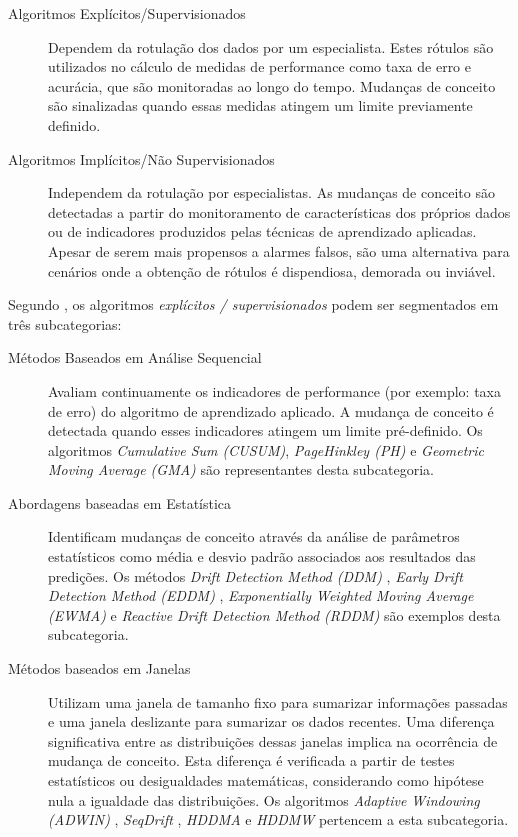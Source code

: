 \documentclass[msc, classic, a4paper]{ufbathesis}
\begin{document}
\begin{description}
    \item[Algoritmos Explícitos/Supervisionados] Dependem da rotulação dos dados por um especialista.
    Estes rótulos são utilizados no cálculo de medidas de performance como taxa de erro e acurácia, que são monitoradas ao longo do tempo.
    Mudanças de conceito são sinalizadas quando essas medidas atingem um limite previamente definido.

    \item[Algoritmos Implícitos/Não Supervisionados] Independem da rotulação por especialistas.
    As mudanças de conceito são detectadas a partir do monitoramento de características dos próprios dados ou de indicadores produzidos pelas técnicas de aprendizado aplicadas.
    Apesar de serem mais propensos a alarmes falsos, são uma alternativa para cenários onde a obtenção de rótulos é dispendiosa, demorada ou inviável.
\end{description}

Segundo , os algoritmos \textit{explícitos / supervisionados} podem ser segmentados em três subcategorias:

\begin{description}
    \item[Métodos Baseados em Análise Sequencial] Avaliam continuamente os indicadores de performance (por exemplo: taxa de erro) do algoritmo de aprendizado aplicado.
    A mudança de conceito é detectada quando esses indicadores atingem um limite pré-definido.
    Os algoritmos \textit{Cumulative Sum (CUSUM)}, \textit{PageHinkley (PH)} \cite{Page:CUSUM:PageHinkley:1954} e \textit{Geometric Moving Average (GMA)} \cite{Roberts:2000:CCT:338441.338464}
    são representantes desta subcategoria.

    \item[Abordagens baseadas em Estatística] Identificam mudanças de conceito através da análise de parâmetros estatísticos como média e desvio padrão associados aos resultados das predições.
    Os métodos \textit{Drift Detection Method (DDM)} \cite{GamaMCR04},
    \textit{Early Drift Detection Method (EDDM)} \cite{EDDM},
    \textit{Exponentially Weighted Moving Average (EWMA)} \cite{Ross:2012:EWM:2076039.2076307} e
    \textit{Reactive Drift Detection Method (RDDM)} \cite{Barros:RDDM:2017} são exemplos desta subcategoria.

    \item[Métodos baseados em Janelas] Utilizam uma janela de tamanho fixo para sumarizar informações passadas e uma janela deslizante para sumarizar os dados recentes.
    Uma diferença significativa entre as distribuições dessas janelas implica na ocorrência de mudança de conceito.
    Esta diferença é verificada a partir de testes estatísticos ou desigualdades matemáticas, considerando como hipótese nula a igualdade das distribuições.
    Os algoritmos
    \textit{Adaptive Windowing (ADWIN)} \cite{BifetG07},
    \textit{SeqDrift} \cite{PearsSK14:SeqDrift:2014},
    \textit{HDDMA} e \textit{HDDMW} \cite{BlancoCRBDM15:HDDMA:HDDMW:2015}
    pertencem a esta subcategoria.
\end{description}
\end{document}
